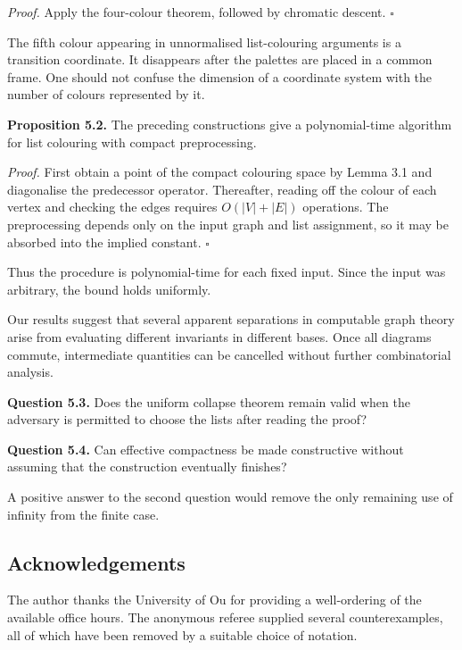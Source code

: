 \documentclass[11pt,letterpaper]{article}
\let\oldsubsection\subsection
\renewcommand{\subsection}{\Needspace{8\baselineskip}\oldsubsection}
\begin{document}
\emph{Proof.} Apply the four-colour theorem, followed by chromatic descent. \(\square\)

The fifth colour appearing in unnormalised list-colouring arguments is a transition coordinate. It disappears after the palettes are placed in a common frame. One should not confuse the dimension of a coordinate system with the number of colours represented by it.

\textbf{Proposition 5.2.} The preceding constructions give a polynomial-time algorithm for list colouring with compact preprocessing.

\emph{Proof.} First obtain a point of the compact colouring space by Lemma 3.1 and diagonalise the predecessor operator. Thereafter, reading off the colour of each vertex and checking the edges requires \(O(|V|+|E|)\) operations. The preprocessing depends only on the input graph and list assignment, so it may be absorbed into the implied constant. \(\square\)

Thus the procedure is polynomial-time for each fixed input. Since the input was arbitrary, the bound holds uniformly.

Our results suggest that several apparent separations in computable graph theory arise from evaluating different invariants in different bases. Once all diagrams commute, intermediate quantities can be cancelled without further combinatorial analysis.

\textbf{Question 5.3.} Does the uniform collapse theorem remain valid when the adversary is permitted to choose the lists after reading the proof?

\textbf{Question 5.4.} Can effective compactness be made constructive without assuming that the construction eventually finishes?

A positive answer to the second question would remove the only remaining use of infinity from the finite case.

\subsection{Acknowledgements}\label{acknowledgements}

The author thanks the University of Ou for providing a well-ordering of the available office hours. The anonymous referee supplied several counterexamples, all of which have been removed by a suitable choice of notation.
\end{document}
